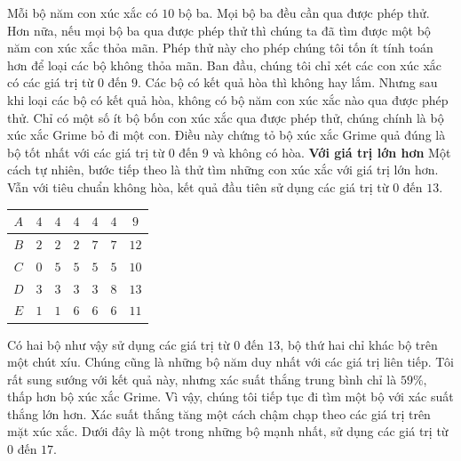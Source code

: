 \begin{multicols}{2}
	\vskip 0.05cm
	Mỗi bộ năm con xúc xắc có $10$ bộ ba. Mọi bộ ba đều cần qua được phép thử. Hơn nữa, nếu mọi bộ ba qua được phép thử thì chúng ta đã tìm được một bộ năm con xúc xắc thỏa mãn.
	\vskip 0.05cm
	Phép thử này cho phép chúng tôi tốn ít tính toán hơn để loại các bộ không thỏa mãn.
	\vskip 0.05cm
	Ban đầu, chúng tôi chỉ xét các con xúc xắc có các giá trị từ $0$ đến $9$. Các bộ có kết quả hòa thì không hay lắm. Nhưng sau khi loại các bộ có kết quả hòa, không có bộ năm con xúc xắc nào qua được phép thử.
	\vskip 0.05cm
	Chỉ có một số ít bộ bốn con xúc xắc qua được phép thử, chúng chính là bộ xúc xắc Grime bỏ đi một con. Điều này chứng tỏ bộ xúc xắc Grime quả đúng là bộ tốt nhất với các giá trị từ $0$ đến $9$ và không có hòa.
	\vskip 0.1cm
	\textbf{\color{quantoan}Với giá trị lớn hơn}
	\vskip 0.1cm
	Một cách tự nhiên, bước tiếp theo là thử tìm những con xúc xắc với giá trị lớn hơn. Vẫn với tiêu chuẩn không hòa, kết quả đầu tiên sử dụng các giá trị từ $0$ đến $13$.
	\begin{table}[H]
		\vspace*{-10pt}
		\centering
		\renewcommand{\arraystretch}{1.1}
		\begin{tabular}{|c|c|c|c|c|c|c|}
			\hline
			$A$ &$4$& $4$& $4$& $4$& $4$& $9$\\
			\hline
			$B$ &$2$& $2$& $2$& $7$& $7$& $12$\\
			\hline
			$C$ &$0$& $5$& $5$& $5$& $5$& $10$\\
			\hline
			$D$ &$3$& $3$& $3$& $3$& $8$& $13$\\
			\hline
			$E$ &$1$& $1$& $6$& $6$& $6$& $11$\\
			\hline
		\end{tabular}
		\vspace*{-10pt}
	\end{table}
	Có hai bộ như vậy sử dụng các giá trị từ $0$ đến $13$, bộ thứ hai chỉ khác bộ trên một chút xíu. Chúng cũng là những bộ năm duy nhất với các giá trị liên tiếp.
	\vskip 0.05cm
	Tôi rất sung sướng với kết quả này, nhưng xác suất thắng trung bình chỉ là $59\%$, thấp hơn bộ xúc xắc Grime. Vì vậy, chúng tôi tiếp tục đi tìm một bộ với xác suất thắng lớn hơn.
	\vskip 0.05cm
	Xác suất thắng tăng một cách chậm chạp theo các giá trị trên mặt xúc xắc. Dưới đây là một trong những bộ mạnh nhất, sử dụng các giá trị từ $0$ đến $17$.
	\begin{table}[H]
		\vspace*{5pt}
		\centering
		\renewcommand{\arraystretch}{1.21}
		\begin{tabular}{|c|c|c|c|c|c|c|}

\end{tabular}
\end{table}
\end{multicols}
